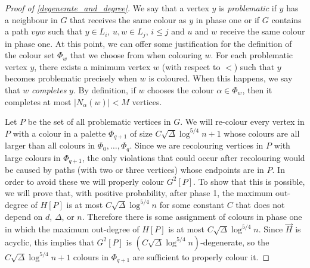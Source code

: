 \documentclass{patmorin}
\newcommand{\defin}[1]{\emph{\color{brightmaroon}#1}}
\begin{document}
\begin{proof}[Proof of \cref{degenerate_and_degree}]

  We say that a vertex $y$ is \defin{problematic} if $y$ has a neighbour in $G$ that receives the same colour as $y$ in phase one or if $G$ contains a path $vyw$ such that $y\in L_i$, $u,w\in L_j$, $i \le j$ and $u$ and $w$ receive the same colour in phase one.  At this point, we can offer some justification for the definition of the colour set $\Phi_w$ that we choose from when colouring $w$. For each problematic vertex $y$, there exists a minimum vertex $w$ (with respect to $<$) such that $y$ becomes problematic precisely when $w$ is coloured.  When this happens, we say that $w$ \defin{completes} $y$. By definition, if $w$ chooses the colour $\alpha\in\Phi_w$, then it completes at most $|N_{\alpha}(w)|<M$ vertices.



  Let $P$ be the set of all problematic vertices in $G$.  We will re-colour every vertex in $P$ with a colour in a palette $\Phi_{q+1}$ of size $C\sqrt{\Delta}\log^{5/4} n+1$ whose colours are all larger than all colours in $\Phi_0,\ldots,\Phi_q$.  Since we are recolouring vertices in $P$ with large colours in $\Phi_{q+1}$, the only violations that could occur after recolouring would be caused by paths (with two or three vertices) whose endpoints are in $P$.  In order to avoid these we will properly colour $G^2[P]$.  To show that this is possible, we will prove that, with positive probability, after phase 1, the maximum out-degree of $H[P]$ is at most $C\sqrt{\Delta}\log^{5/4} n$ for some constant $C$ that does not depend on $d$, $\Delta$, or $n$.  Therefore there is some assignment of colours in phase one in which the maximum out-degree of $H[P]$ is at most $C\sqrt{\Delta}\log^{5/4} n$.  Since $\overrightarrow{H}$ is acyclic, this implies that $G^2[P]$ is $(C\sqrt{\Delta}\log^{5/4} n)$-degenerate, so the $C\sqrt{\Delta}\log^{5/4} n+1$ colours in $\Phi_{q+1}$ are sufficient to properly colour it.


\end{proof}
\end{document}
